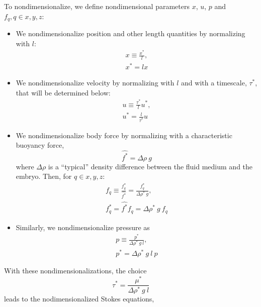 \documentclass[10pt,a4paper]{article}
\def\l{\mathit{l}}
\begin{document}
To nondimensionalize, we define nondimensional parameters $x$, $u$, $p$ and $f_q, q \in x, y, z$:
\begin{itemize}
	\item We nondimensionalize position and other length quantities by normalizing with $l$:
	\begin{eqnarray*}
		x \equiv \frac{x^*}{\mathit{l}} , \\
		x^* = \mathit{l} x 
	\end{eqnarray*} 
	\item We nondimensionalize velocity by normalizing with $l$ and with a timescale, $\tau^*$, that will be determined below:
	\begin{eqnarray*}
		u \equiv \frac{\tau^*}{\mathit{l}} u^* , \\
		u^* = \frac{\mathit{l}}{\tau^*} u 
	\end{eqnarray*} 
	\item We nondimensionalize body force by normalizing with a characteristic buoyancy force,
	\begin{equation}\label{charforce}
		\hat{f^*} = \Delta \rho ~ g
	\end{equation}
	where $\Delta \rho$ is a ``typical'' density difference between the fluid medium and the embryo. 
	Then, for $q \in x, y, z$:
	\begin{eqnarray*}
		f_q \equiv \frac{f_q^*}{\hat{f^*}}  = \frac{f_q^*}{\Delta \rho^* ~ g} , \\
		f_q^* = \hat{f^*} f_q = \Delta \rho^* ~ g ~ f_q
	\end{eqnarray*} 
	\item Similarly, we nondimensionalize pressure as
	\begin{eqnarray*}
		p \equiv  \frac{ p^*}{\Delta \rho^* ~ g ~ l} , \\
		p^* = \Delta \rho^* ~ g ~ l ~ p  
	\end{eqnarray*} 
\end{itemize}
With these nondimensionalizations, the choice 
\begin{equation}\label{tau_def}
	\tau^* = \frac{\mu^*}{\Delta \rho^* ~ g ~ l}
\end{equation}
leads to the nodimensionalized Stokes equations,
\end{document}
